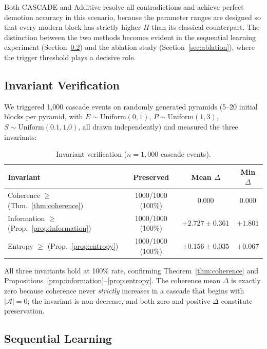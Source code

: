 \documentclass[11pt,a4paper]{article}
\theoremstyle{definition}
\newcommand{\tp}{\Pi}
\begin{document}
Both CASCADE and Additive resolve all contradictions and achieve perfect demotion
accuracy in this scenario, because the parameter ranges are designed so that every
modern block has strictly higher $\tp$ than its classical counterpart. The distinction
between the two methods becomes evident in the sequential learning experiment
(Section~\ref{sec:sequential}) and the ablation study (Section~\ref{sec:ablation}),
where the trigger threshold plays a decisive role.

\subsection{Invariant Verification}\label{sec:invariants}

We triggered 1{,}000 cascade events on randomly generated pyramids (5--20 initial
blocks per pyramid, with $E \sim \text{Uniform}(0,1)$, $P \sim \text{Uniform}(1,3)$,
$S \sim \text{Uniform}(0.1,1.0)$, all drawn independently) and measured the three
invariants:

\begin{table}[H]
\centering
\caption{Invariant verification ($n = 1{,}000$ cascade events).}
\label{tab:invariants}
\begin{tabular}{@{}lccc@{}}
\toprule
\textbf{Invariant} & \textbf{Preserved} & \textbf{Mean $\Delta$} & \textbf{Min $\Delta$} \\
\midrule
Coherence $\geq$ (Thm.~\ref{thm:coherence})    & 1000/1000 (100\%) & $0.000$ & $0.000$ \\
Information $\geq$ (Prop.~\ref{prop:information}) & 1000/1000 (100\%) & $+2.727 \pm 0.361$ & $+1.801$ \\
Entropy $\geq$ (Prop.~\ref{prop:entropy})       & 1000/1000 (100\%) & $+0.156 \pm 0.035$ & $+0.067$ \\
\bottomrule
\end{tabular}
\end{table}

All three invariants hold at 100\% rate, confirming Theorem~\ref{thm:coherence} and
Propositions~\ref{prop:information}--\ref{prop:entropy}. The coherence mean $\Delta$ is
exactly zero because coherence never \emph{strictly} increases in a cascade that begins
with $|\mathcal{A}| = 0$; the invariant is non-decrease, and both zero and positive
$\Delta$ constitute preservation.

\subsection{Sequential Learning}\label{sec:sequential}
\end{document}
